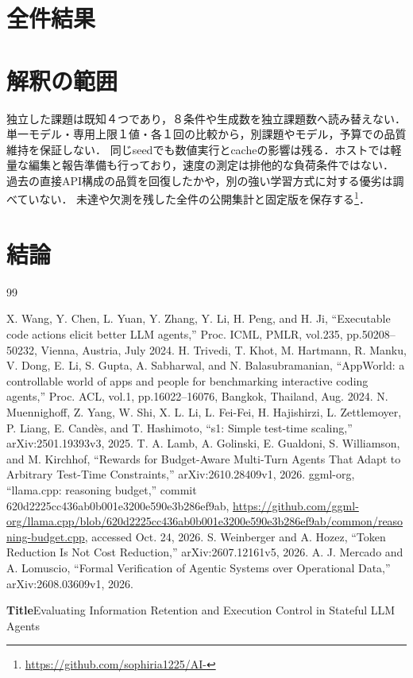\documentclass[uplatex,a4paper,twocolumn,10pt]{jsarticle}
\begin{document}
\section{全件結果}



\section{解釈の範囲}
独立した課題は既知４つであり，８条件や生成数を独立課題数へ読み替えない．
単一モデル・専用上限１値・各１回の比較から，別課題やモデル，予算での品質維持を保証しない．
同じseedでも数値実行とcacheの影響は残る．ホストでは軽量な編集と報告準備も行っており，速度の測定は排他的な負荷条件ではない．
過去の直接API構成の品質を回復したかや，別の強い学習方式に対する優劣は調べていない．
未達や欠測を残した全件の公開集計と固定版を保存する\footnote{\url{https://github.com/sophiria1225/AI-}}．

\section{結論}

\begin{thebibliography}{99}
\small
\raggedright
{} X. Wang, Y. Chen, L. Yuan, Y. Zhang, Y. Li, H. Peng, and H. Ji, ``Executable code actions elicit better LLM agents,'' Proc. ICML, PMLR, vol.235, pp.50208--50232, Vienna, Austria, July 2024.
 H. Trivedi, T. Khot, M. Hartmann, R. Manku, V. Dong, E. Li, S. Gupta, A. Sabharwal, and N. Balasubramanian, ``AppWorld: a controllable world of apps and people for benchmarking interactive coding agents,'' Proc. ACL, vol.1, pp.16022--16076, Bangkok, Thailand, Aug. 2024.
 N. Muennighoff, Z. Yang, W. Shi, X. L. Li, L. Fei-Fei, H. Hajishirzi, L. Zettlemoyer, P. Liang, E. Cand\`es, and T. Hashimoto, ``s1: Simple test-time scaling,'' arXiv:2501.19393v3, 2025.
 T. A. Lamb, A. Golinski, E. Gualdoni, S. Williamson, and M. Kirchhof, ``Rewards for Budget-Aware Multi-Turn Agents That Adapt to Arbitrary Test-Time Constraints,'' arXiv:2610.28409v1, 2026.
 ggml-org, ``llama.cpp: reasoning budget,'' commit 620d2225cc436ab0b001e3200e590e3b286ef9ab, \url{https://github.com/ggml-org/llama.cpp/blob/620d2225cc436ab0b001e3200e590e3b286ef9ab/common/reasoning-budget.cpp}, accessed Oct. 24, 2026.
 S. Weinberger and A. Hozez, ``Token Reduction Is Not Cost Reduction,'' arXiv:2607.12161v5, 2026.
 A. J. Mercado and A. Lomuscio, ``Formal Verification of Agentic Systems over Operational Data,'' arXiv:2608.03609v1, 2026.
\end{thebibliography}
\clearpage
\onecolumn
\noindent\textbf{Title}\quad Evaluating Information Retention and Execution Control in Stateful LLM Agents
\end{document}
